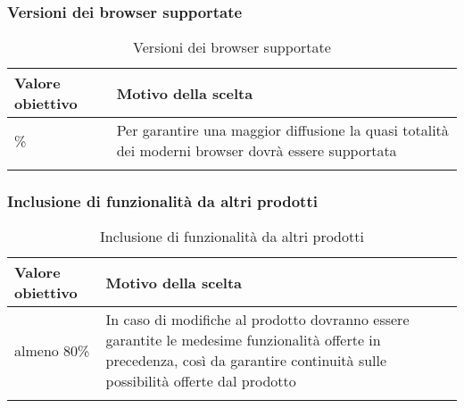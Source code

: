\documentclass[../PianoDiQualifica.tex]{subfiles}
\begin{document}
		\subsubsection{Versioni dei browser supportate}
			\begin{longtable}[c] { >{\centering\arraybackslash}p{4cm} p{7cm} }
				\toprule
				\centerline{\textbf{Valore obiettivo}} & \centerline{\textbf{Motivo della scelta}} \\
				\midrule
					95\% &	Per garantire una maggior diffusione la quasi totalità dei moderni browser dovrà essere supportata \\
				\bottomrule
				\caption{Versioni dei browser supportate}
			\end{longtable}
			
		\subsubsection{Inclusione di funzionalità da altri prodotti}
			\begin{longtable}[c] { >{\centering\arraybackslash}p{4cm} p{7cm} }
				\toprule
				\centerline{\textbf{Valore obiettivo}} & \centerline{\textbf{Motivo della scelta}} \\
				\midrule
					almeno 80\% & In caso di modifiche al prodotto dovranno essere garantite le medesime funzionalità  offerte in precedenza, così da garantire continuità sulle possibilità offerte dal prodotto \\
				\bottomrule
				\caption{Inclusione di funzionalità da altri prodotti}
			\end{longtable}
		
\end{document}
